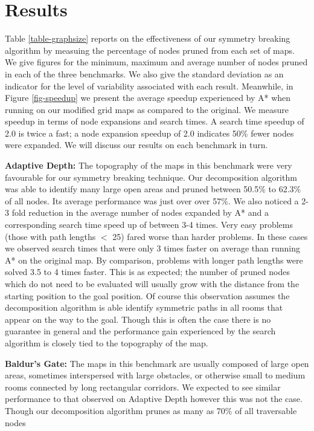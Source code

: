 \section{Results}
\label{sec-results}
Table \ref{table-graphsize} reports on the effectiveness of our symmetry breaking
algorithm by measuing the percentage of nodes pruned from each set of maps.
We give figures for the minimum, maximum and average number of nodes pruned
in each of the three benchmarks.
We also give the standard deviation as an indicator for the level of variability
associated with each result.
Meanwhile, in Figure \ref{fig-speedup} we present the average speedup experienced by A* 
when running on our modified grid maps as compared to the original.
We measure speedup in terms of node expansions and search times.
A search time speedup of 2.0 is twice a fast; a node expansion speedup of 2.0 
indicates 50\% fewer nodes were expanded.
We will discuss our results on each benchmark in turn.

\textbf{Adaptive Depth:} 
The topography of the maps in this benchmark were very favourable for our
symmetry breaking technique.
Our decomposition algorithm was able to identify many large open areas and
pruned between 50.5\% to 62.3\% of all nodes.
Its average performance was just over over 57\%. 
We also noticed a 2-3 fold reduction in the average number of nodes expanded 
by A* and a corresponding search time speed up of between 3-4 times.
Very easy problems (those with path lengths $<$ 25) fared worse than harder
problems. 
In these cases we observed search times that were only 3 times faster on average 
than running A* on the original map. 
By comparison, problems with longer path lengths were solved 3.5 to 4 times faster.
This is as expected; the number of pruned nodes which do not need to be evaluated
will usually grow with the distance from the starting position to the goal
position. 
Of course this observation assumes the decomposition algorithm is able identify
symmetric paths in all rooms that appear on the way to the goal.
Though this is often the case there is no guarantee in general and the performance
gain experienced by the search algorithm is closely tied to the topography of 
the map.
\par
\textbf{Baldur's Gate: }
The maps in this benchmark are usually composed of large open areas, sometimes
interspersed with large obstacles, or otherwise small to medium rooms connected
by long rectangular corridors.
We expected to see similar performance to that observed on Adaptive Depth
however this was not the case.
Though our decomposition algorithm prunes as many as 70\% of all traversable nodes 
